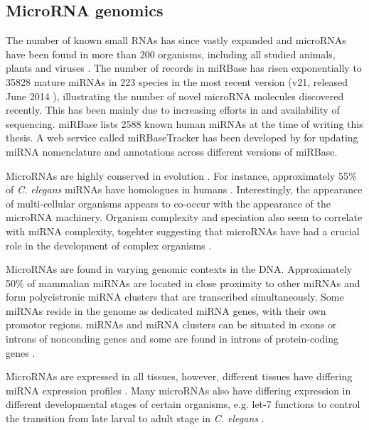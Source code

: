 \subsection{MicroRNA genomics}\label{microrna-genomics}

The number of known small RNAs has since vastly expanded and microRNAs have
been found in more than 200 organisms, including all studied animals, plants
\citep{JonesRhoades2006} and viruses \citep{Grundhoff2011}. The number of
records in miRBase has risen exponentially
to 35828 mature miRNAs in 223 species in the most recent
version (v21, released June 2014 \citep{MiRBaseWeb}), illustrating
the number of novel microRNA molecules discovered recently. This has been mainly due to
increasing efforts in and availability of sequencing. miRBase lists 2588 known
human miRNAs at the time of writing this thesis. A web service called
miRBaseTracker has been developed by \citet{VanPeer2014} for updating miRNA
nomenclature and annotations across different versions of miRBase.

MicroRNAs are highly conserved in evolution \citep{Bartel2004}. For instance,
approximately 55\% of \emph{C. elegans} miRNAs have homologues in humans
\citep{IbanezVentoso2008}. Interestingly, the
appearance of multi-cellular organisms appears to co-occur with the appearance
of the microRNA machinery. Organism complexity and speciation also seem to
correlate with miRNA complexity, togehter suggesting that microRNAs have had a
crucial role in the development of complex organisms \citep{Lee2007}.

MicroRNAs are found in varying genomic contexts in the DNA. Approximately 50\% of
mammalian miRNAs are located in close proximity to other miRNAs and form
polycistronic miRNA clusters that are transcribed simultaneously. Some miRNAs
reside in the genome as dedicated miRNA genes, with their own promotor regions.
\citep{Kim2009} miRNAs and miRNA clusters can be situated in exons or
introns of nonconding genes and some are found in introns of protein-coding genes
\citep{Du2005}.

MicroRNAs are expressed in all tissues, however, different tissues have
differing miRNA expression profiles \citep{Krol2010}. Many microRNAs also have
differing expression in different developmental stages of certain organisms, e.g.
let-7 functions to control the transition from late larval to adult stage in
\emph{C. elegans} \citep{Bartel2004}.

